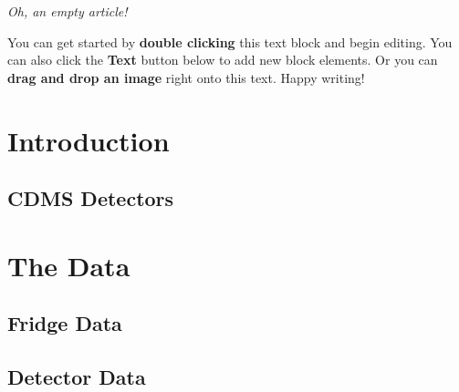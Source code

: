 \textit{Oh, an empty article!} 

You can get started by \textbf{double clicking} this text block and begin editing. You can also click the \textbf{Text} button below to add new block elements. Or you can \textbf{drag and drop an image} right onto this text. Happy writing!

\section{Introduction}
\subsection{CDMS Detectors}

\section{The Data}
\subsection{Fridge Data}
\subsection{Detector Data}